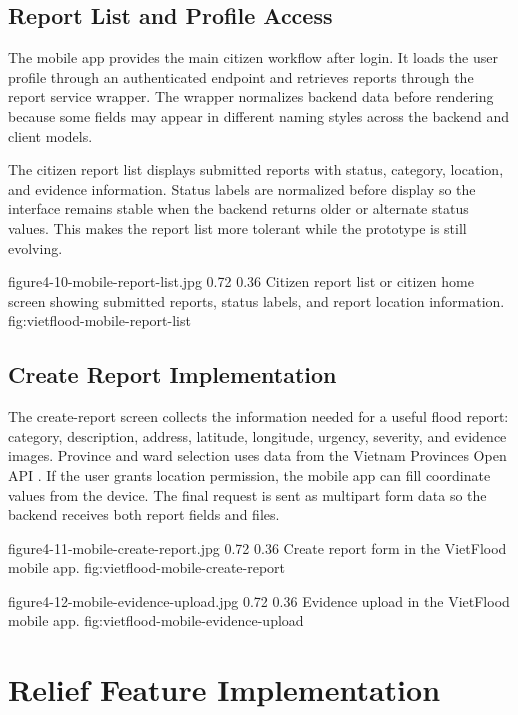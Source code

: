 \subsection{Report List and Profile Access}

The mobile app provides the main citizen workflow after login. It loads the user profile through an authenticated endpoint and retrieves reports through the report service wrapper. The wrapper normalizes backend data before rendering because some fields may appear in different naming styles across the backend and client models.

The citizen report list displays submitted reports with status, category, location, and evidence information. Status labels are normalized before display so the interface remains stable when the backend returns older or alternate status values. This makes the report list more tolerant while the prototype is still evolving.

\vfplaceholderfigure
    {figure4-10-mobile-report-list.jpg}
    {0.72}
    {0.36}
    {Citizen report list or citizen home screen showing submitted reports, status labels, and report location information.}
    {fig:vietflood-mobile-report-list}

\subsection{Create Report Implementation}

The create-report screen collects the information needed for a useful flood report: category, description, address, latitude, longitude, urgency, severity, and evidence images. Province and ward selection uses data from the Vietnam Provinces Open API \cite{vietnamProvincesOpenApi}. If the user grants location permission, the mobile app can fill coordinate values from the device. The final request is sent as multipart form data so the backend receives both report fields and files.

\vfplaceholderfigure
    {figure4-11-mobile-create-report.jpg}
    {0.72}
    {0.36}
    {Create report form in the VietFlood mobile app.}
    {fig:vietflood-mobile-create-report}

\vfplaceholderfigure
    {figure4-12-mobile-evidence-upload.jpg}
    {0.72}
    {0.36}
    {Evidence upload in the VietFlood mobile app.}
    {fig:vietflood-mobile-evidence-upload}

\section{Relief Feature Implementation}

